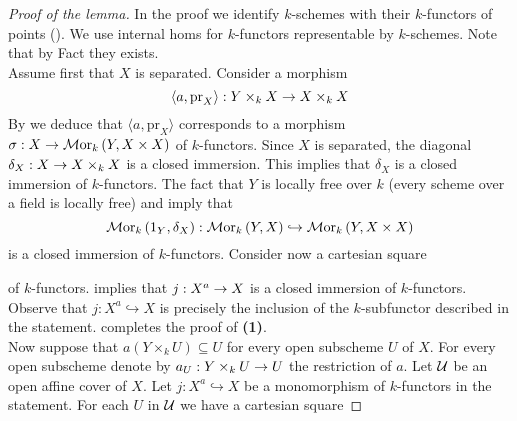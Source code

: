 \begin{proof}[Proof of the lemma]
In the proof we identify $k$-schemes with their $k$-functors of points ({\cite[Remark 3.8]{kfunctors}}). We use internal homs for $k$-functors representable by $k$-schemes. Note that by Fact {\cite[Fact 3.10]{kfunctors}} they exists.\\
Assume first that $X$ is separated. Consider a morphism
$$\langle a, \mathrm{pr}_X\rangle:Y\times_kX\rightarrow X\times_k X$$
By {\cite[Theorem 2.6]{kfunctors}} we deduce that $\langle a, \mathrm{pr}_X\rangle$ corresponds to a morphism $\sigma:X \rightarrow \mathcal{M}\mathrm{or}_k\left(Y, X\times X\right)$ of $k$-functors. Since $X$ is separated, the diagonal $\delta_X:X\rightarrow X\times_k X$ is a closed immersion. This implies that $\delta_X$ is a closed immersion of $k$-functors. The fact that $Y$ is locally free over $k$ (every scheme over a field is locally free) and {\cite[Theorem 8.2]{kfunctors}} imply that
$$\mathcal{M}\mathrm{or}_k\left(1_Y, \delta_X \right):\mathcal{M}\mathrm{or}_k\left( Y,X \right) \hookrightarrow \mathcal{M}\mathrm{or}_k\left(Y, X \times X \right)$$
is a closed immersion of $k$-functors. Consider now a cartesian square
\begin{center}
\end{center}
of $k$-functors. {\cite[Fact 5.8]{kfunctors}} implies that $j:X^a\rightarrow X$ is a closed immersion of $k$-functors. Observe that $j:X^a \hookrightarrow X$ is precisely the inclusion of the $k$-subfunctor described in the statement. {\cite[Proposition 5.9]{kfunctors}} completes the proof of \textbf{(1)}.\\
Now suppose that $a\left(Y\times_kU\right) \subseteq U$ for every open subscheme $U$ of $X$. For every open subscheme denote by $a_U:Y\times_kU\rightarrow U$ the restriction of $a$. Let ${\mathcal U}$ be an open affine cover of $X$. Let $j: X^a \hookrightarrow X$ be a monomorphism of $k$-functors in the statement. For each $U$ in ${\mathcal U}$ we have a cartesian square

\end{proof}
